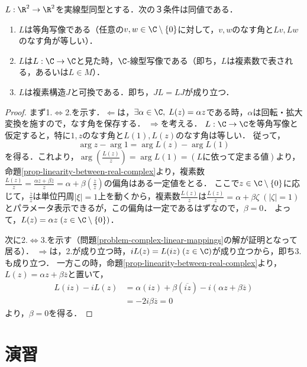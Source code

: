 \documentclass[uplatex, dvipdfmx]{jsreport}
\begin{document}
\begin{shadebox}\begin{theorem}\label{thm-conformal-Clinear-communicative}
    $L:\R^2\to\R^2$を実線型同型とする．次の３条件は同値である．
    \begin{enumerate}
        \item $L$は等角写像である（任意の$v,w\in\C\setminus\{0\}$に対して，$v,w$のなす角と$Lv,Lw$のなす角が等しい）．
        \item $L$は$L:\C\to\C$と見た時，$\C$-線型写像である（即ち，$L$は複素数で表される，あるいは$L\in M$）．
        \item $L$は複素構造$J$と可換である．即ち，$JL=LJ$が成り立つ．
    \end{enumerate}
\end{theorem}\end{shadebox}
\begin{proof}
    まず1.$\Leftrightarrow$2.を示す．$\Leftarrow$は，$\exists\alpha\in\C,\; L(z)=\alpha z$である時，$\alpha$は回転・拡大変換を施すので，なす角を保存する．
    $\Rightarrow$を考える．
    $L:\C\to\C$を等角写像と仮定すると，特に$1,z$のなす角と$L(1),L(z)$のなす角は等しい．
    従って，
    \[ \arg z-\arg 1=\arg L(z)-\arg L(1) \]
    を得る．これより，$\arg\left(\frac{L(z)}{z}\right)=\arg L(1)=(Lに依って定まる値)$より，
    命題\ref{prop-linearity-between-real-complex}より，複素数$\frac{L(z)}{z}=\frac{\alpha z+\beta\overline{z}}{z}=\alpha+\beta\left(\frac{\overline{z}}{z}\right)$の偏角はある一定値をとる．
    ここで$z\in\C\setminus\{0\}$に応じて，$\frac{\overline{z}}{z}$は単位円周$|\xi|=1$上を動くから，複素数$\frac{L(z)}{z}$は$\frac{L(z)}{z}=\alpha+\beta\zeta\;(|\zeta|=1)$とパラメータ表示できるが，この偏角は一定であるはずなので，$\beta=0$．
    よって，$L(z)=\alpha z\;(z\in\C\setminus\{0\})$．

    次に2.$\Leftrightarrow$3.を示す（問題\ref{problem-complex-linear-mappings}の解が証明となって居る）．
    $\Rightarrow$は，2.が成り立つ時，$iL(z)=L(iz)\;(z\in\C)$が成り立つから，即ち3.も成り立つ．
    一方この時，命題\ref{prop-linearity-between-real-complex}より，$L(z)=\alpha z+\beta\overline{z}$と置いて，
    \begin{align*}
        L(iz)-iL(z) &= \alpha (iz)+\beta(\overline{iz}) - i(\alpha z+\beta\overline{z})\\
        &= -2i\beta\overline{z}=0
    \end{align*}
    より，$\beta=0$を得る．
\end{proof}

\section{演習}
\end{document}
